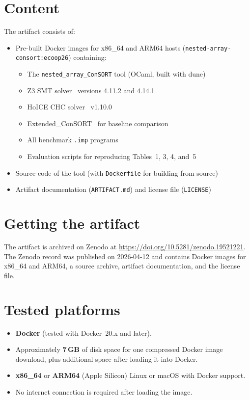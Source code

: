 \documentclass[a4paper,USenglish]{darts-v2021}
\newenvironment{content}{\section{Content}}{}
\newenvironment{getting}{\section{Getting the artifact}}{}
\newenvironment{platforms}{\section{Tested platforms}}{}
\begin{document}

\begin{content}

The artifact consists of:

\begin{itemize}
  \item Pre-built Docker images for x86\_64 and ARM64 hosts (\texttt{nested-array-consort:ecoop26}) containing:
    \begin{itemize}
      \item The \texttt{nested\_array\_ConSORT} tool (OCaml, built with dune)
      \item Z3 SMT solver~\cite{z3} versions 4.11.2 and 4.14.1
      \item HoICE CHC solver~\cite{hoice} v1.10.0
      \item Extended\_ConSORT~\cite{tanaka} for baseline comparison
      \item All benchmark \texttt{.imp} programs
      \item Evaluation scripts for reproducing Tables~1, 3, 4, and~5
    \end{itemize}
  \item Source code of the tool (with \texttt{Dockerfile} for building from source)
  \item Artifact documentation (\texttt{ARTIFACT.md}) and license file (\texttt{LICENSE})
\end{itemize}
\end{content}


\begin{getting}

The artifact is archived on Zenodo at
\url{https://doi.org/10.5281/zenodo.19521221}.
The Zenodo record was published on 2026-04-12 and contains Docker images for x86\_64
and ARM64, a source archive, artifact documentation, and the license file.
\end{getting}


\begin{platforms}

\begin{itemize}
  \item \textbf{Docker} (tested with Docker~20.x and later).
  \item Approximately \textbf{7\,GB} of disk space for one compressed Docker image
        download, plus additional space after loading it into Docker.
  \item \textbf{x86\_64} or \textbf{ARM64} (Apple Silicon) Linux or macOS with Docker support.
  \item No internet connection is required after loading the image.
\end{itemize}
\end{platforms}
\end{document}
